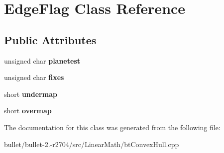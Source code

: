 \hypertarget{class_edge_flag}{\section{Edge\+Flag Class Reference}
\label{class_edge_flag}
}
\subsection*{Public Attributes}
\begin{DoxyCompactItemize}
\item 
\hypertarget{class_edge_flag_a6e5372d1cf36447c801442308c2a0d32}{unsigned char {\bfseries planetest}}\label{class_edge_flag_a6e5372d1cf36447c801442308c2a0d32}

\item 
\hypertarget{class_edge_flag_ad681ddcf6f44c3936f1a4efba07f7f30}{unsigned char {\bfseries fixes}}\label{class_edge_flag_ad681ddcf6f44c3936f1a4efba07f7f30}

\item 
\hypertarget{class_edge_flag_a569af1bad9bd0be9504b010f220b2b9b}{short {\bfseries undermap}}\label{class_edge_flag_a569af1bad9bd0be9504b010f220b2b9b}

\item 
\hypertarget{class_edge_flag_a3a58eb62c97e43c4f8fbf578d117e436}{short {\bfseries overmap}}\label{class_edge_flag_a3a58eb62c97e43c4f8fbf578d117e436}

\end{DoxyCompactItemize}


The documentation for this class was generated from the following file\+:\begin{DoxyCompactItemize}
\item 
bullet/bullet-\/2.-\/r2704/src/\+Linear\+Math/bt\+Convex\+Hull.\+cpp\end{DoxyCompactItemize}
